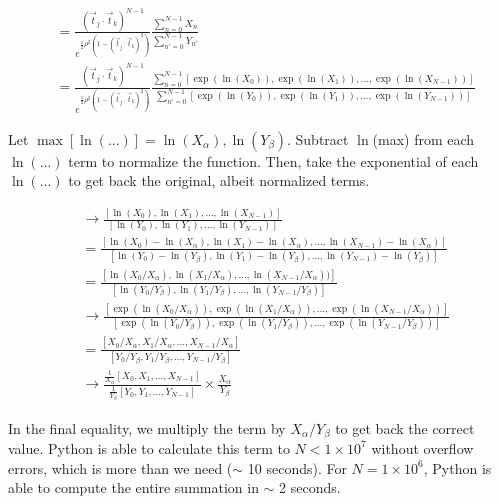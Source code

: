 \documentclass[12pt]{article}
\newcommand{\tjtk}{(\vec{t}_j\cdot\vec{t}_k)}
\begin{document}
   \begin{align}
   &= \frac{\tjtk^{N-1}}{e^{\frac{1}{2}\rho^2(1-\tjtk^2)}} 
   \frac{ \sum_{n=0}^{N-1} X_n } 
   { \sum_{n'=0}^{N-1} Y_{n'} } \\
   &= \frac{\tjtk^{N-1}}{e^{\frac{1}{2}\rho^2(1-\tjtk^2)}} 
   \frac{ \sum_{n=0}^{N-1} [\exp(\ln(X_0)),\exp(\ln(X_1)),...,\exp(\ln(X_{N-1}))] } 
   { \sum_{n'=0}^{N-1} [\exp(\ln(Y_0)),\exp(\ln(Y_1)),...,\exp(\ln(Y_{N-1}))] }
   \end{align}

Let $\max[\ln(...)] = \ln(X_\alpha), \ln(Y_\beta)$. Subtract $\ln$(max) from each $\ln(...)$ term to normalize the function. Then, take the exponential of each $\ln(...)$ to get back the original, albeit normalized terms.

   \begin{align}
   &\rightarrow \frac{[\ln(X_0),\ln(X_1),...,\ln(X_{N-1})]}{[\ln(Y_0),\ln(Y_1),...,\ln(Y_{N-1})]} \\
   &= \frac{[\ln(X_0)-\ln(X_\alpha),\ln(X_1)-\ln(X_\alpha),...,\ln(X_{N-1})-\ln(X_\alpha)]}{[\ln(Y_0)-\ln(Y_\beta),\ln(Y_1)-\ln(Y_\beta),...,\ln(Y_{N-1})-\ln(Y_\beta)]} \\
   &= \frac{[\ln(X_0/X_\alpha),\ln(X_1/X_\alpha),...,\ln(X_{N-1}/X_\alpha))]}{[\ln(Y_0/Y_\beta),\ln(Y_1/Y_\beta),...,\ln(Y_{N-1}/Y_\beta)]} \\
   &\rightarrow \frac{[\exp(\ln(X_0/X_\alpha)),\exp(\ln(X_1/X_\alpha)),...,\exp(\ln(X_{N-1}/X_\alpha))]}{[\exp(\ln(Y_0/Y_\beta)),\exp(\ln(Y_1/Y_\beta)),...,\exp(\ln(Y_{N-1}/Y_\beta))]} \\
   &= \frac{[X_0/X_\alpha,X_1/X_\alpha,...,X_{N-1}/X_\alpha]}{[Y_0/Y_\beta,Y_1/Y_\beta,...,Y_{N-1}/Y_\beta]} \\
   &\rightarrow\frac{\frac{1}{X_\alpha}[X_0,X_1,...,X_{N-1}]}{\frac{1}{Y_\beta}[Y_0,Y_1,...,Y_{N-1}]} \times \frac{X_\alpha}{Y_\beta}
   \end{align}

In the final equality, we multiply the term by $X_\alpha/Y_\beta$ to get back the correct value. Python is able to calculate this term to $N < 1\times10^{7}$ without overflow errors, which is more than we need ($\sim$ 10 seconds). For $N = 1\times10^{6}$, Python is able to compute the entire summation in $\sim$ 2 seconds.
\end{document}
